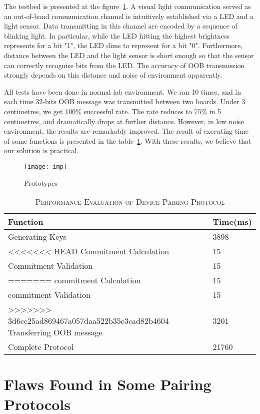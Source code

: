 \begin{enumerate}
\begin{enumerate}
The testbed is presented at the figure~\ref{imp}. A visual light communication served as an out-of-band communication channel is intuitively established via a LED and a light sensor. Data transmitting in this channel are encoded by a sequence of blinking light. In particular, while the LED hitting the highest brightness represents for a bit "1", the LED dims to represent for a bit "0". Furthermore, distance between the LED and the light sensor is short enough so that the sensor can correctly recognise bits from the LED. The accuracy of OOB transmission strongly depends on this distance and noise of environment apparently. 

All tests have been done in normal lab environment. We ran 10 times, and in each time 32-bits OOB message was transmitted between two boards. Under 3 centimetres, we get 100\% successful rate. The rate reduces to 75\% in 5 centimetres, and dramatically drops at further distance. However, in low noise environment, the results are remarkably improved. The result of executing time of some functions is presented in the table~\ref{evaluation}. With these results, we believe that our solution is practical.

\begin{figure}
  \centering
  \texttt{[image: imp]}
  \caption{Prototypes}
  \label{imp}
\end{figure}

\begin{table}[t]
\centering
\caption{\textsc{Performance Evaluation of Device Pairing Protocol}}
\label{evaluation}
{\small
\begin{tabular}{| p{5cm} | p{3cm} |}
 \hline
\textbf{Function} & \textbf{Time(ms)} \\ \hline \hline
Generating Keys & 3898 \\ \hline
<<<<<<< HEAD
Commitment Calculation & 15 \\ \hline
Commitment Validation & 15 \\ \hline
=======
commitment Calculation & 15 \\ \hline
commitment Validation & 15 \\ \hline
>>>>>>> 3d6cc25ad869467a057daa522b35e3cad82b4604
Transferring OOB message & 3201 \\ \hline
Complete Protocol & 21760 \\ \hline
\end{tabular}
}
\end{table}

\section{Flaws Found in Some Pairing Protocols}


\end{enumerate}
\end{enumerate}
